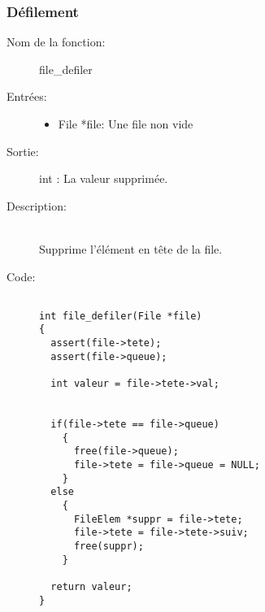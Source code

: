 \documentclass[a4paper]{article}
\begin{document}
\subsubsection{Défilement}

\begin{description}
  \item[Nom de la fonction:] file\_defiler

  \item[Entrées:] \hfill
    \begin{itemize}
      \item File *file: Une file non vide
    \end{itemize}

 \item[Sortie:] \hfill
   int : La valeur supprimée.

  \item[Description:] \hfill \\ 
    Supprime l'élément en tête de la file.

  \item[Code:] \hfill 
  \begin{lstlisting}

int file_defiler(File *file)
{
  assert(file->tete);
  assert(file->queue);

  int valeur = file->tete->val;


  if(file->tete == file->queue)
    {
      free(file->queue);
      file->tete = file->queue = NULL;
    }
  else
    {
      FileElem *suppr = file->tete;
      file->tete = file->tete->suiv;
      free(suppr);
    }

  return valeur;
}
  \end{lstlisting}


\end{description}
\end{document}
